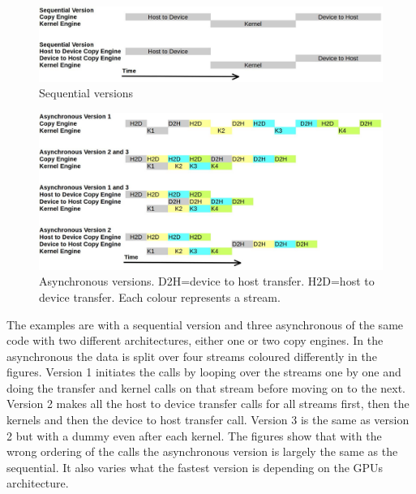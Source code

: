 \documentclass[10pt,a4paper]{report}
\begin{document}
\begin{figure}[h]
    \centering
    \includegraphics[width=12cm]{streams_seq.jpg}
    \caption{Sequential versions}
    \label{fig:sequential}
\end{figure}

\begin{figure}[h]
    \centering
    \includegraphics[width=12cm]{streams_async.jpg}
    \caption{Asynchronous versions. D2H=device to host transfer. H2D=host to device transfer. Each colour represents a stream.}
    \label{fig:ascynchronous}
\end{figure}

The examples are with a sequential version and three asynchronous of the same code with two different architectures, either one or two copy engines. In the asynchronous the data is split over four streams coloured differently in the figures. Version 1 initiates the calls by looping over the streams one by one and doing the transfer and kernel calls on that stream before moving on to the next\cite{cuda_fortran_overlap}. Version 2 makes all the host to device transfer calls for all streams first, then the kernels and then the device to host transfer call\cite{cuda_fortran_overlap}. Version 3 is the same as version 2 but with a dummy even after each kernel\cite{cuda_fortran_overlap}. The figures show that with the wrong ordering of the calls the asynchronous version is largely the same as the sequential. It also varies what the fastest version is depending on the GPUs architecture.
\end{document}
